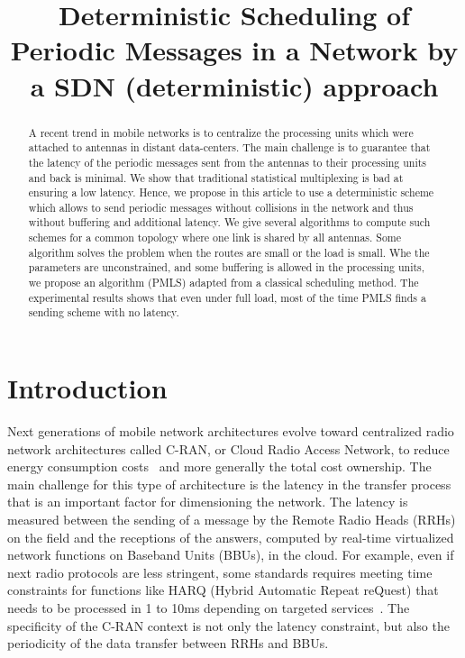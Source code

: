 \documentclass[10pt, conference, letterpaper]{IEEEtran}
\title{Deterministic Scheduling of Periodic Messages in a Network by a SDN (deterministic) approach}
\author{}
\begin{document}
\maketitle

\begin{abstract}
A recent trend in mobile networks is to centralize the processing units which were attached to 
antennas in distant data-centers. The main challenge is to guarantee that the latency of the periodic messages 
sent from the antennas to their processing units and back is minimal. We show that traditional statistical multiplexing
is bad at ensuring a low latency. Hence, we propose in this article to use a deterministic scheme which allows to send periodic messages without collisions in the network and thus without buffering and additional latency.
We give several algorithms to compute such schemes for a common topology where one link is shared by all antennas.
Some algorithm solves the problem when the routes are small or the load is small. Whe the parameters are unconstrained,
and some buffering is allowed in the processing units, we propose an algorithm (PMLS) adapted from a classical scheduling method.
The experimental results shows that even under full load, most of the time PMLS finds a sending scheme with no latency.
\end{abstract}


\section{Introduction}

Next generations of mobile network architectures evolve toward centralized radio network architectures called C-RAN, or Cloud Radio Access Network, to reduce energy consumption costs~\cite{mobile2011c} and more generally the total cost ownership. The main challenge for this type of architecture is the latency in the transfer process that is an important factor for dimensioning the network. The latency is measured between the sending of a message by the Remote Radio Heads (RRHs) on the field and the receptions of the answers, computed by real-time virtualized network functions on Baseband Units (BBUs), in the cloud. For example, even if next radio protocols are less stringent, some standards requires meeting time constraints for functions like HARQ (Hybrid Automatic Repeat reQuest) that needs to be processed in 1 to 10ms depending on targeted services~\cite{bouguen2012lte}. The specificity of the C-RAN context is not only the latency constraint, but also the periodicity of the data transfer between RRHs and BBUs.
\end{document}

